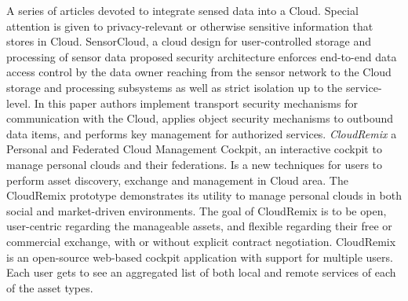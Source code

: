 \newline
	A series of articles devoted to integrate sensed data into a Cloud. Special attention is given to privacy-relevant or otherwise sensitive information that stores in Cloud. SensorCloud\cite{hummen2012cloud}, a cloud design for user-controlled storage and processing of sensor data proposed security architecture enforces end-to-end data access control by the data owner reaching from the sensor network to the Cloud storage and processing subsystems as well as strict isolation up to the service-level. In this paper authors implement transport security mechanisms for communication with the Cloud, applies object security mechanisms to outbound data items, and performs key management for authorized services. \emph{CloudRemix\cite{spillner2013personal}} a Personal and Federated Cloud Management Cockpit, an interactive cockpit to manage personal clouds and their federations. Is a new techniques for users to perform asset discovery, exchange and management in Cloud area. The CloudRemix prototype demonstrates its utility to manage personal clouds in both social and market-driven environments. The goal of CloudRemix is to be open, user-centric regarding the manageable assets, and flexible regarding their free or commercial exchange, with or without explicit contract negotiation. CloudRemix is an open-source web-based cockpit application with support for multiple users. Each user gets to see an aggregated list of both local and remote services of each of the asset types.


